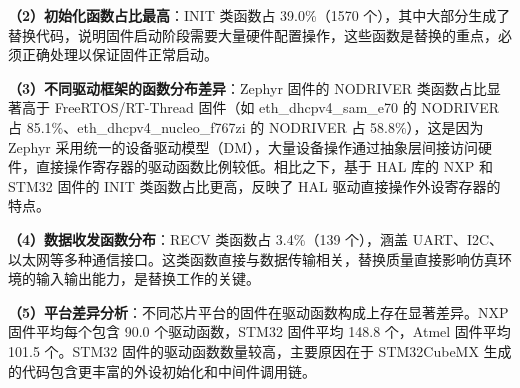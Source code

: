 \textbf{（2）初始化函数占比最高}：INIT 类函数占 39.0\%（1570 个），其中大部分生成了替换代码，说明固件启动阶段需要大量硬件配置操作，这些函数是替换的重点，必须正确处理以保证固件正常启动。

\textbf{（3）不同驱动框架的函数分布差异}：Zephyr 固件的 NODRIVER 类函数占比显著高于 FreeRTOS/RT-Thread 固件（如 eth\_dhcpv4\_sam\_e70 的 NODRIVER 占 85.1\%、eth\_dhcpv4\_nucleo\_f767zi 的 NODRIVER 占 58.8\%），这是因为 Zephyr 采用统一的设备驱动模型（DM），大量设备操作通过抽象层间接访问硬件，直接操作寄存器的驱动函数比例较低。相比之下，基于 HAL 库的 NXP 和 STM32 固件的 INIT 类函数占比更高，反映了 HAL 驱动直接操作外设寄存器的特点。

\textbf{（4）数据收发函数分布}：RECV 类函数占 3.4\%（139 个），涵盖 UART、I2C、以太网等多种通信接口。这类函数直接与数据传输相关，替换质量直接影响仿真环境的输入输出能力，是替换工作的关键。

\textbf{（5）平台差异分析}：不同芯片平台的固件在驱动函数构成上存在显著差异。NXP 固件平均每个包含 90.0 个驱动函数，STM32 固件平均 148.8 个，Atmel 固件平均 101.5 个。STM32 固件的驱动函数数量较高，主要原因在于 STM32CubeMX 生成的代码包含更丰富的外设初始化和中间件调用链。

%
%
%
%

